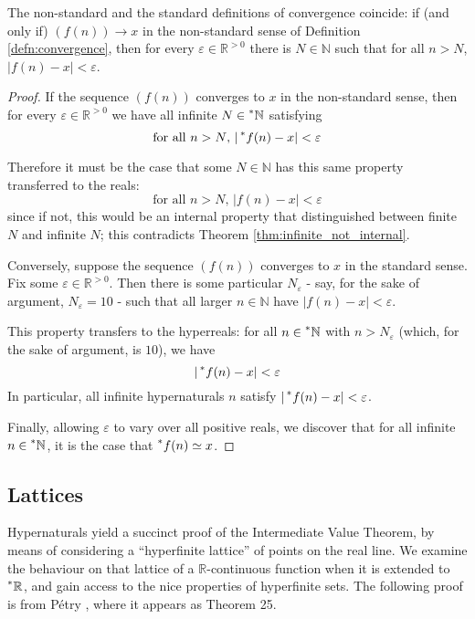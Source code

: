 \documentclass[11pt]{amsart}
\theoremstyle{remark}
\newcommand{\hyp}[1][\mathbb{R}]{\prescript{*}{}{#1}}
\newcommand{\near}{\simeq}
\begin{document}
\begin{thm} \label{thm:convergenceequivalent} The non-standard and the standard definitions of convergence coincide: if (and only if) $(f(n)) \to x$ in the non-standard sense of Definition \ref{defn:convergence}, then for every $\varepsilon \in \mathbb{R}^{>0}$ there is $N \in \mathbb{N}$ such that for all $n > N$, $|f(n) - x| < \varepsilon$.
\end{thm}
\begin{proof}
If the sequence $(f(n))$ converges to $x$ in the non-standard sense, then for every $\varepsilon \in \mathbb{R}^{>0}$ we have all infinite $N \in \hyp[\mathbb{N}]$ satisfying 
$$\text{for all $n > N$, $|\hyp[f](n) - x| < \varepsilon$}$$

Therefore it must be the case that some $N \in \mathbb{N}$ has this same property transferred to the reals:
$$\text{for all $n > N$, $|f(n) - x| < \varepsilon$}$$
since if not, this would be an internal property that distinguished between finite $N$ and infinite $N$; this contradicts Theorem \ref{thm:infinite_not_internal}.

Conversely, suppose the sequence $(f(n))$ converges to $x$ in the standard sense.
Fix some $\varepsilon \in \mathbb{R}^{>0}$.
Then there is some particular $N_{\varepsilon}$ - say, for the sake of argument, $N_{\varepsilon} = 10$ - such that all larger $n \in \mathbb{N}$ have $|f(n) - x| < \varepsilon$.

This property transfers to the hyperreals: for all $n \in \hyp[\mathbb{N}]$ with $n > N_{\varepsilon}$ (which, for the sake of argument, is $10$), we have $$|\hyp[f](n)-x| < \varepsilon$$
In particular, all infinite hypernaturals $n$ satisfy $|\hyp[f](n) - x| < \varepsilon$.

Finally, allowing $\varepsilon$ to vary over all positive reals, we discover that for all infinite $n \in \hyp[\mathbb{N}]$, it is the case that $\hyp[f](n) \near x$.
\end{proof}

\subsection{Lattices}

Hypernaturals yield a succinct proof of the Intermediate Value Theorem, by means of considering a ``hyperfinite lattice'' of points on the real line.
We examine the behaviour on that lattice of a $\mathbb{R}$-continuous function when it is extended to $\hyp$, and gain access to the nice properties of hyperfinite sets.
The following proof is from P\'etry \cite{petry}, where it appears as Theorem 25.
\end{document}
